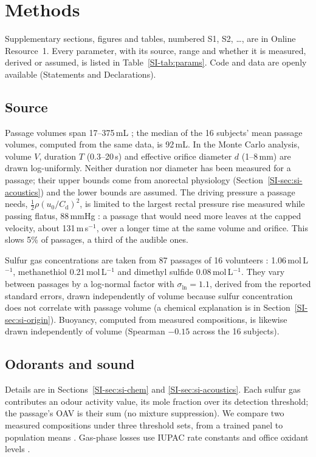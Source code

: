 \section{Methods}
\label{sec:methods}

Supplementary sections, figures and tables, numbered S1, S2, \ldots, are in Online Resource~1. Every parameter,
with its source, range and whether it is measured, derived or assumed, is listed in Table~\ref{SI-tab:params}. Code
and data are openly available (Statements and Declarations).

\subsection{Source}
\label{sec:source}
Passage volumes span 17--375\,mL \cite{suarez1997}; the median of the 16 subjects' mean passage volumes,
computed from the same data, is 92\,mL. In the Monte Carlo analysis, volume $V$,
duration $T$ (0.3--20\,s) and effective orifice diameter $d$ (1--8\,mm) are drawn log-uniformly. Neither duration nor
diameter has been measured for a passage; their upper bounds come from anorectal physiology
(Section~\ref{SI-sec:si-acoustics}) and the lower bounds are assumed. The driving pressure a passage needs,
$\tfrac12\rho(u_0/C_\mathrm{d})^2$, is limited to the largest rectal pressure rise measured while passing flatus,
88\,mmHg \cite{miller1988b}: a passage that would need more leaves at the capped velocity, about 131\,m\,s$^{-1}$, over
a longer time at the same volume and orifice. This slows 5\% of passages, a third of the audible ones.

Sulfur gas concentrations are taken from 87 passages of 16 volunteers \cite{suarez1998}: 
1.06\,\textmu mol\,L$^{-1}$, methanethiol 0.21\,\textmu mol\,L$^{-1}$ and dimethyl sulfide 0.08\,\textmu mol\,L$^{-1}$.
They vary between passages by a log-normal factor with $\sigma_{\ln} = 1.1$, derived from the reported standard
errors, drawn independently of volume because sulfur concentration does not correlate with passage volume
\cite{suarez1997} (a chemical explanation is in Section~\ref{SI-sec:si-origin}). Buoyancy, computed from measured compositions, is likewise drawn independently of volume
(Spearman $-0.15$ across the 16 subjects).

\subsection{Odorants and sound}
\label{sec:methods-chem}
\label{sec:acoustics}
Details are in Sections~\ref{SI-sec:si-chem} and \ref{SI-sec:si-acoustics}. Each sulfur gas contributes an odour
activity value, its mole fraction over its detection threshold; the passage's OAV is their sum (no mixture
suppression). We compare two measured compositions \cite{suarez1998,tangerman2009} under three threshold sets, from a
trained panel \cite{nagata2003} to population means \cite{amoore1983}. Gas-phase losses use IUPAC rate
constants \cite{atkinson2004} and office oxidant levels \cite{fiorentino2023}.

